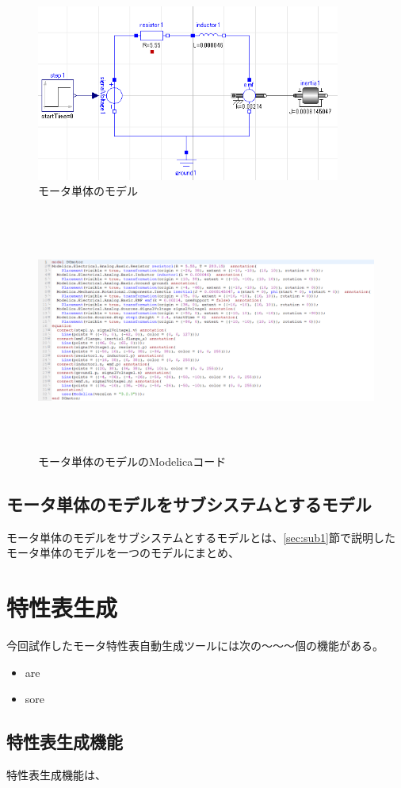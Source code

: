 \begin{figure}[t]
  \centering
  \includegraphics[width=10cm]{./Image/tantai_model.png}
  \caption{モータ単体のモデル}
  \label{fig:tantai_model}
\end{figure}

\begin{figure}[t]
	\centering
	\includegraphics[width=16.5cm,height=8cm]{./Image/tantai_modelica.png}
	\caption{モータ単体のモデルのModelicaコード}
	\label{fig:tantai_modelica}
  \end{figure}

\subsection{モータ単体のモデルをサブシステムとするモデル}\label{sec:sub2}
モータ単体のモデルをサブシステムとするモデルとは、\ref{sec:sub1}節で説明した
モータ単体のモデルを一つのモデルにまとめ、





\section{特性表生成}\label{kenkyu_mokuteki}
今回試作したモータ特性表自動生成ツールには次の～～～個の機能がある。

\begin{itemize}
	\item are
	\item sore 
\end{itemize}

\subsection{特性表生成機能}\label{sec:tokusei}
特性表生成機能は、

